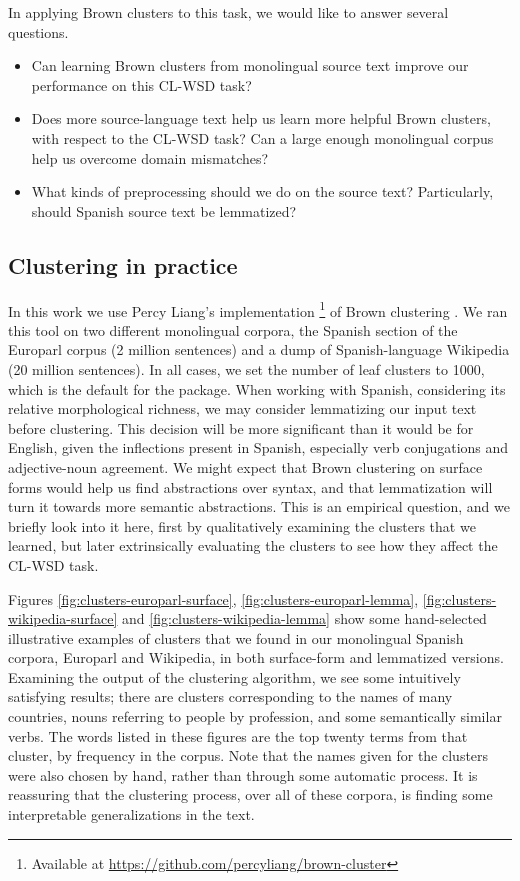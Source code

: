 In applying Brown clusters to this task, we would like to answer several
questions.

\begin{itemize}
  \item Can learning Brown clusters from monolingual source text improve our
  performance on this CL-WSD task?
  \item Does more source-language text help us learn more helpful Brown
  clusters, with respect to the CL-WSD task? Can a large enough monolingual
  corpus help us overcome domain mismatches?
  \item What kinds of preprocessing should we do on the source text?
  Particularly, should Spanish source text be lemmatized?
\end{itemize}

\subsection{Clustering in practice}
In this work we use Percy Liang's implementation \footnote{Available at
\url{https://github.com/percyliang/brown-cluster}} of Brown clustering
\cite{Liang05semi-supervisedlearning}. We ran this tool on two different
monolingual corpora, the Spanish section of the Europarl corpus \cite{europarl}
(2 million sentences) and a dump of Spanish-language Wikipedia (20 million
sentences). In all cases, we set the number of leaf clusters to 1000, which is
the default for the package.
When working with Spanish, considering its relative morphological richness, we
may consider lemmatizing our input text before clustering. This decision will
be more significant than it would be for English, given the inflections present
in Spanish, especially verb conjugations and adjective-noun agreement.
We might expect that Brown clustering on surface forms would help us find
abstractions over syntax, and that lemmatization will turn it towards more
semantic abstractions. This is an empirical question, and we briefly look into
it here, first by qualitatively examining the clusters that we learned, but
later extrinsically evaluating the clusters to see how they affect the CL-WSD
task.



Figures \ref{fig:clusters-europarl-surface}, \ref{fig:clusters-europarl-lemma},
\ref{fig:clusters-wikipedia-surface} and \ref{fig:clusters-wikipedia-lemma}
show some hand-selected illustrative examples of clusters that we found in our
monolingual Spanish corpora, Europarl and Wikipedia, in both surface-form and
lemmatized versions. Examining the output of the clustering algorithm, we see
some intuitively satisfying results; there are clusters corresponding to the
names of many countries, nouns referring to people by profession, and some
semantically similar verbs. The words listed in these figures are the top
twenty terms from that cluster, by frequency in the corpus. Note that the names
given for the clusters were also chosen by hand, rather than through some
automatic process. It is reassuring that the clustering process, over all of
these corpora, is finding some interpretable generalizations in the text.

